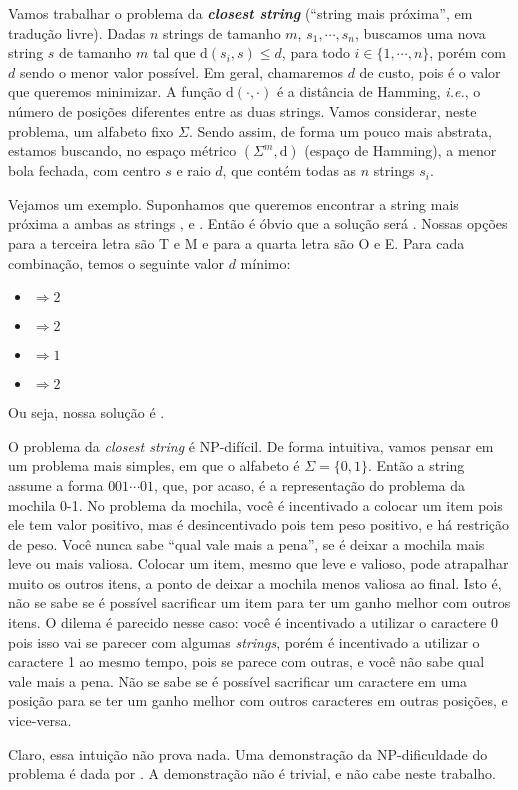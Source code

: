 Vamos trabalhar o problema da \textbf{\textit{closest string}} (``string mais próxima'', em tradução livre). Dadas $n$ strings de tamanho $m$, $s_1, \cdots, s_n$, buscamos uma nova string $s$ de tamanho $m$ tal que $\text{d}(s_i, s) \le d$, para todo $i \in \{1, \cdots, n\}$, porém com $d$ sendo o menor valor possível. Em geral, chamaremos $d$ de custo, pois é o valor que queremos minimizar. A função $\text{d}(\cdot, \cdot)$ é a distância de Hamming, \textit{i.e.}, o número de posições diferentes entre as duas strings. Vamos considerar, neste problema, um alfabeto fixo $\Sigma$.
Sendo assim, de forma um pouco mais abstrata, estamos buscando, no espaço métrico $\left(\Sigma^m, \text{d}\right)$ (espaço de Hamming), a menor bola fechada, com centro $s$ e raio $d$, que contém todas as $n$ strings $s_i$.

Vejamos um exemplo. Suponhamos que queremos encontrar a string mais próxima a ambas as strings ,  e . Então é óbvio que a solução será . Nossas opções para a terceira letra são T e M e para a quarta letra são O e E. Para cada combinação, temos o seguinte valor $d$ mínimo:
\begin{itemize}
    \item {} $\Rightarrow 2$
    \item {} $\Rightarrow 2$
    \item {} $\Rightarrow 1$
    \item {} $\Rightarrow 2$
\end{itemize}
Ou seja, nossa solução é .

O problema da \textit{closest string} é NP-difícil.
De forma intuitiva, vamos pensar em um problema mais simples, em que o alfabeto é $\Sigma = \{0, 1\}$. Então a string assume a forma $001 \cdots 01$, que, por acaso, é a representação do problema da mochila 0-1. No problema da mochila, você é incentivado a colocar um item pois ele tem valor positivo, mas é desincentivado pois tem peso positivo, e há restrição de peso. Você nunca sabe ``qual vale mais a pena'', se é deixar a mochila mais leve ou mais valiosa. Colocar um item, mesmo que leve e valioso, pode atrapalhar muito os outros itens, a ponto de deixar a mochila menos valiosa ao final. Isto é, não se sabe se é possível sacrificar um item para ter um ganho melhor com outros itens. O dilema é parecido nesse caso: você é incentivado a utilizar o caractere 0 pois isso vai se parecer com algumas \textit{strings}, porém é incentivado a utilizar o caractere 1 ao mesmo tempo, pois se parece com outras, e você não sabe qual vale mais a pena. Não se sabe se é possível sacrificar um caractere em uma posição para se ter um ganho melhor com outros caracteres em outras posições, e vice-versa.

Claro, essa intuição não prova nada. Uma demonstração da NP-dificuldade do problema é dada por \cite{frances1997covering}. A demonstração não é trivial, e não cabe neste trabalho.